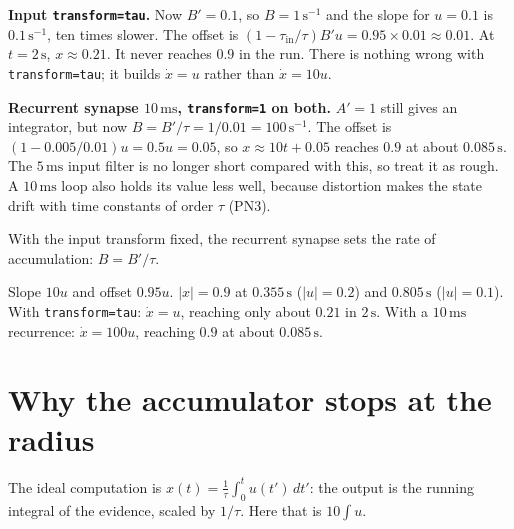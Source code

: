 \documentclass[11pt,letterpaper]{article}
\newcommand{\tin}{\tau_{\mathrm{in}}}
\newcommand{\ans}[1]{\par\vspace{4pt}{\bfseries #1}\quad}
\begin{document}
\ans{Q2}
\textbf{Input \texttt{transform=tau}.} Now $B' = 0.1$, so $B = 1\,\mathrm{s^{-1}}$ and the slope for $u = 0.1$ is $0.1\,\mathrm{s^{-1}}$, ten times slower. The offset is $(1 - \tin/\tau)B'u = 0.95 \times 0.01 \approx 0.01$. At $t = 2\,\mathrm{s}$, $x \approx 0.21$. It never reaches $0.9$ in the run. There is nothing wrong with \texttt{transform=tau}; it builds $\dot x = u$ rather than $\dot x = 10u$.

\textbf{Recurrent synapse $10\,\mathrm{ms}$, \texttt{transform=1} on both.} $A' = 1$ still gives an integrator, but now $B = B'/\tau = 1/0.01 = 100\,\mathrm{s^{-1}}$. The offset is $(1 - 0.005/0.01)u = 0.5u = 0.05$, so $x \approx 10t + 0.05$ reaches $0.9$ at about $0.085\,\mathrm{s}$. The $5\,\mathrm{ms}$ input filter is no longer short compared with this, so treat it as rough. A $10\,\mathrm{ms}$ loop also holds its value less well, because distortion makes the state drift with time constants of order $\tau$ (PN3).

With the input transform fixed, the recurrent synapse sets the rate of accumulation: $B = B'/\tau$.
\begin{result}
Slope $10u$ and offset $0.95u$. $|x| = 0.9$ at $0.355\,\mathrm{s}$ ($|u| = 0.2$) and $0.805\,\mathrm{s}$ ($|u| = 0.1$). With \texttt{transform=tau}: $\dot x = u$, reaching only about $0.21$ in $2\,\mathrm{s}$. With a $10\,\mathrm{ms}$ recurrence: $\dot x = 100u$, reaching $0.9$ at about $0.085\,\mathrm{s}$.
\end{result}

\section{Why the accumulator stops at the radius}

\ans{Q1}
The ideal computation is $x(t) = \frac{1}{\tau}\int_0^t u(t')\,dt'$: the output is the running integral of the evidence, scaled by $1/\tau$. Here that is $10\int u$.
\end{document}
